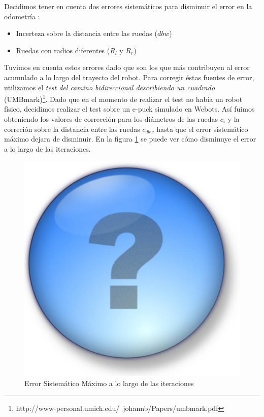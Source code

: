 Decidimos tener en cuenta dos errores sistem\'aticos para disminuir el error en la odometr\'ia :
\begin{itemize}
\item{Incerteza sobre la distancia entre las ruedas ($dbw$)}
\item{Ruedas con radios diferentes ($R_l$ y $R_r$)}
\end{itemize}
Tuvimos en cuenta estos errores dado que son los que m\'as contribuyen al error acumulado a lo
largo del trayecto del robot.
Para corregir \'estas fuentes de error, utilizamos el \emph{test del camino
bidireccional describiendo un cuadrado} (UMBmark)\footnote{http://www-personal.umich.edu/~johannb/Papers/umbmark.pdf}.
Dado que en el momento de realizar el test no hab\'ia un robot f\'isico, decidimos realizar el test sobre
un e-puck simulado en Webots.
As\'i fuimos obteniendo los valores de correcci\'on para los di\'ametros de las ruedas $c_i$ y la correci\'on
sobre la distancia entre las ruedas $c_{dbw}$ hasta que el error sistem\'atico m\'aximo dejara de disminuir. En la
figura \ref{fig:errsist} se puede ver c\'omo disminuye el error a lo largo de las iteraciones.

\begin{figure}[htp]
\begin{center}
\includegraphics[scale=0.3]{comportamientos/unk.jpg}
\caption{Error Sistem\'atico M\'aximo a lo largo de las iteraciones}
\label{fig:errsist}
\end{center}
\end{figure}

